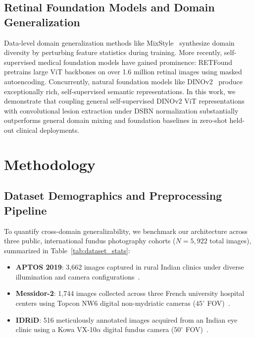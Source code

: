 \documentclass[conference]{IEEEtran}
\begin{document}
\subsection{Retinal Foundation Models and Domain Generalization}
Data-level domain generalization methods like MixStyle~\cite{zhou2021domain} synthesize domain diversity by perturbing feature statistics during training. More recently, self-supervised medical foundation models have gained prominence: RETFound~\cite{zhou2023retfound} pretrains large ViT backbones on over 1.6 million retinal images using masked autoencoding. Concurrently, natural foundation models like DINOv2~\cite{oquab2023dinov2} produce exceptionally rich, self-supervised semantic representations. In this work, we demonstrate that coupling general self-supervised DINOv2 ViT representations with convolutional lesion extraction under DSBN normalization substantially outperforms general domain mixing and foundation baselines in zero-shot held-out clinical deployments.

\section{Methodology}

\subsection{Dataset Demographics and Preprocessing Pipeline}
To quantify cross-domain generalizability, we benchmark our architecture across three public, international fundus photography cohorts ($N=5,922$ total images), summarized in Table~\ref{tab:dataset_stats}:
\begin{itemize}
    \item \textbf{APTOS 2019}: 3,662 images captured in rural Indian clinics under diverse illumination and camera configurations~\cite{aptos2019}.
    \item \textbf{Messidor-2}: 1,744 images collected across three French university hospital centers using Topcon NW6 digital non-mydriatic cameras ($45^\circ$ FOV)~\cite{decenciere2014feedback}.
    \item \textbf{IDRiD}: 516 meticulously annotated images acquired from an Indian eye clinic using a Kowa VX-10$\alpha$ digital fundus camera ($50^\circ$ FOV)~\cite{porwal2018idrid}.
\end{itemize}
\end{document}
